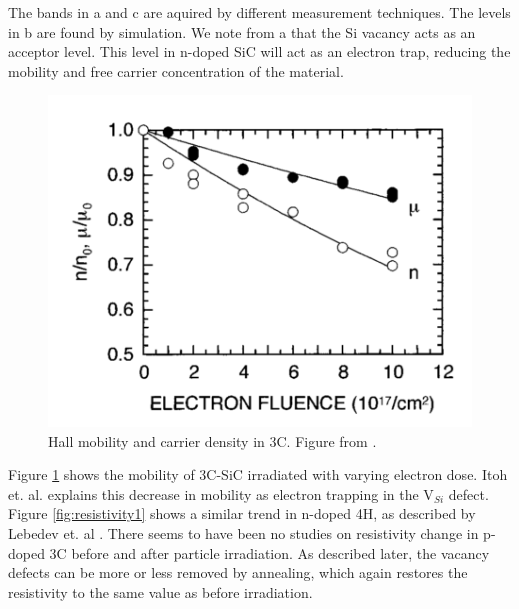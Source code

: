 \documentclass[a4paper,12pt]{article}
\begin{document}
The bands in a and c are aquired by different measurement techniques. The levels in b are found by simulation. We note from a that the Si vacancy acts as an acceptor level. This level in n-doped SiC will act as an electron trap, reducing the mobility and free carrier concentration of the material. 

\begin{figure}[H]
\begin{center}
\includegraphics[scale=0.7]{mobility.png}
\caption{Hall mobility and carrier density in 3C. Figure from \cite{Itoh1997}.
\label{fig:mobility}}
\end{center}
\end{figure}

Figure \ref{fig:mobility} shows the mobility of 3C-SiC irradiated with varying electron dose. Itoh et. al. \cite{Itoh1997} explains this decrease in mobility as electron trapping in the V$_{Si}$ defect. Figure \ref{fig:resistivity1} shows a similar trend in n-doped 4H, as described by Lebedev et. al \cite{Lebedev2000}. There seems to have been no studies on resistivity change in p-doped 3C before and after particle irradiation. As described later, the vacancy defects can be more or less removed by annealing, which again restores the resistivity to the same value as before irradiation. 
\end{document}
